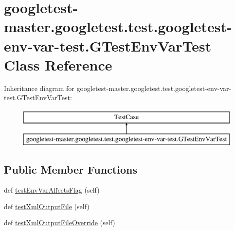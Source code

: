 \hypertarget{classgoogletest-master_1_1googletest_1_1test_1_1googletest-env-var-test_1_1_g_test_env_var_test}{}\section{googletest-\/master.googletest.\+test.\+googletest-\/env-\/var-\/test.G\+Test\+Env\+Var\+Test Class Reference}
\label{classgoogletest-master_1_1googletest_1_1test_1_1googletest-env-var-test_1_1_g_test_env_var_test}
Inheritance diagram for googletest-\/master.googletest.\+test.\+googletest-\/env-\/var-\/test.G\+Test\+Env\+Var\+Test\+:\begin{figure}[H]
\begin{center}
\leavevmode
\includegraphics[height=2.000000cm]{d5/d84/classgoogletest-master_1_1googletest_1_1test_1_1googletest-env-var-test_1_1_g_test_env_var_test}
\end{center}
\end{figure}
\subsection*{Public Member Functions}
\begin{DoxyCompactItemize}
\item 
def \mbox{\hyperlink{classgoogletest-master_1_1googletest_1_1test_1_1googletest-env-var-test_1_1_g_test_env_var_test_a06f21125213dfa9209d2790549dc4492}{test\+Env\+Var\+Affects\+Flag}} (self)
\item 
def \mbox{\hyperlink{classgoogletest-master_1_1googletest_1_1test_1_1googletest-env-var-test_1_1_g_test_env_var_test_a6d2d055e0ffa281d73b188840cf8240a}{test\+Xml\+Output\+File}} (self)
\item 
def \mbox{\hyperlink{classgoogletest-master_1_1googletest_1_1test_1_1googletest-env-var-test_1_1_g_test_env_var_test_afd65bc0ed417dc36ebc7908dd1992ad4}{test\+Xml\+Output\+File\+Override}} (self)
\end{DoxyCompactItemize}


